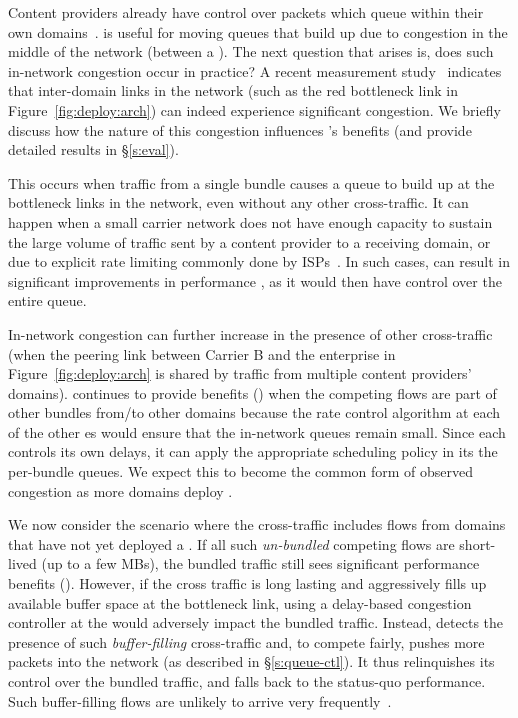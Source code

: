 Content providers already have control over packets which queue within their own domains~\cite{swan, b4, bwe}. \name is useful for moving queues that build up due to congestion in the middle of the network (\ie between a \pair).
The next question that arises is, does such in-network congestion occur in practice? A recent measurement study~\cite{inferring-interdomain-congestion} indicates that inter-domain links in the network (such as the red bottleneck link in Figure~\ref{fig:deploy:arch}) can indeed experience significant congestion. 
We briefly discuss how the nature of this congestion influences \name's benefits (and provide detailed results in \S\ref{s:eval}).

 This occurs when traffic from a single bundle causes a queue to build up at the bottleneck links in the network, even without any other cross-traffic. It can happen when a small carrier network does not have enough capacity to sustain the large volume of traffic sent by a content provider to a receiving domain, or due to explicit rate limiting commonly done by ISPs~\cite{isp-throttle-1, isp-throttle-2, isp-throttle-3}. In such cases, \name can result in
significant improvements in performance , as it would then have control over the entire queue. 

 In-network congestion can further increase in the presence of other cross-traffic (\eg when the peering link between Carrier B and the enterprise in Figure~\ref{fig:deploy:arch} is shared by traffic from multiple content providers' domains). 
\name continues to provide benefits () when the competing flows are part of other bundles from/to other domains because the rate control algorithm at each of the other {\inbox}es would ensure that the in-network queues remain small. Since each \inbox controls its own delays, it can apply the appropriate scheduling policy in its the per-bundle queues.
We expect this to become the common form of observed congestion as more domains deploy \name. 

 We now consider the scenario where the cross-traffic includes flows from domains that have not yet deployed a \name. If all such \emph{un-bundled} competing flows are short-lived (up to a few MBs), the bundled traffic still sees significant performance benefits (). 
However, if the cross traffic is long lasting and aggressively fills up available buffer space at the bottleneck link, using a delay-based congestion controller  at the \name would adversely impact the bundled traffic. Instead, \name detects the presence of such \emph{buffer-filling} cross-traffic and, to compete fairly, pushes more packets into the network (as described in \S\ref{s:queue-ctl}). It thus relinquishes its control over the bundled traffic, and falls back to the status-quo performance.
Such buffer-filling flows are unlikely to arrive very frequently~\cite{caida-dataset}. 

